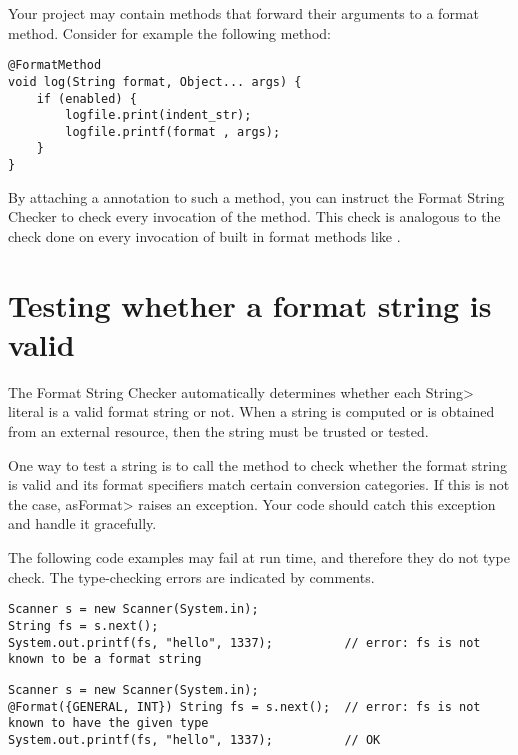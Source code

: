Your project may contain methods that forward their arguments to a format method.
Consider for example the following  method:

\begin{Verbatim}
@FormatMethod
void log(String format, Object... args) {
    if (enabled) {
        logfile.print(indent_str);
        logfile.printf(format , args);
    }
}
\end{Verbatim}

By attaching a  annotation to
such a method, you can instruct the Format String Checker to check every
invocation of the method. This check is analogous to the check done on
every invocation of built in format methods like .

\section{Testing whether a format string is valid\label{formatter-run-time-tests}}


The Format String Checker automatically determines whether each \<String>
literal is a valid format string or not.  When a string is computed or is
obtained from an external resource, then the string must be trusted or tested.

One way to test a string is to call the
method to check whether the format string is valid and its format
specifiers match certain conversion categories.
If this is not the case, \<asFormat> raises an exception.  Your code should
catch this exception and handle it gracefully.

The following code examples may fail at run time, and therefore they do not
type check.  The type-checking errors are indicated by comments.

\begin{Verbatim}
Scanner s = new Scanner(System.in);
String fs = s.next();
System.out.printf(fs, "hello", 1337);          // error: fs is not known to be a format string
\end{Verbatim}

\begin{Verbatim}
Scanner s = new Scanner(System.in);
@Format({GENERAL, INT}) String fs = s.next();  // error: fs is not known to have the given type
System.out.printf(fs, "hello", 1337);          // OK
\end{Verbatim}

